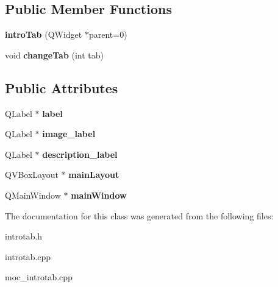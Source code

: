 \subsection*{Public Member Functions}
\begin{DoxyCompactItemize}
\item 
\mbox{\label{classintroTab_aab649dfc9a71489cd08871faca7684a9}} 
{\bfseries intro\+Tab} (Q\+Widget $\ast$parent=0)
\item 
\mbox{\label{classintroTab_a3ff2701ec758f8a9e2e663b9dac7e84c}} 
void {\bfseries change\+Tab} (int tab)
\end{DoxyCompactItemize}
\subsection*{Public Attributes}
\begin{DoxyCompactItemize}
\item 
\mbox{\label{classintroTab_a62af4606a05e32cec1902e4b3a9c7a7c}} 
Q\+Label $\ast$ {\bfseries label}
\item 
\mbox{\label{classintroTab_afac3999d62248dee277ea3ad4a37ed60}} 
Q\+Label $\ast$ {\bfseries image\+\_\+label}
\item 
\mbox{\label{classintroTab_aec6d0b3cd99b3d517cb4ca29e445b990}} 
Q\+Label $\ast$ {\bfseries description\+\_\+label}
\item 
\mbox{\label{classintroTab_a1209ccb530831d7c642817f47ecada86}} 
Q\+V\+Box\+Layout $\ast$ {\bfseries main\+Layout}
\item 
\mbox{\label{classintroTab_a7ddb2126611ddecd31543dc6210c0c7e}} 
Q\+Main\+Window $\ast$ {\bfseries main\+Window}
\end{DoxyCompactItemize}


The documentation for this class was generated from the following files\+:\begin{DoxyCompactItemize}
\item 
introtab.\+h\item 
introtab.\+cpp\item 
moc\+\_\+introtab.\+cpp\end{DoxyCompactItemize}
